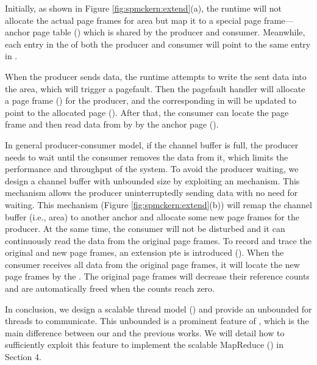 Initially, as shown in Figure \ref{fig:spmckern:extend}(a), the runtime will not allocate the actual page frames for  area but map it to a special page frame--- anchor page table () which is shared by the producer and consumer.
Meanwhile, each entry in the  of both the producer and consumer will point to the same entry in . 

When the producer sends data, the runtime attempts to write the sent data into the  area, which will trigger a pagefault. 
Then the pagefault handler will allocate a page frame () for the producer, and the corresponding  in  will be updated to point to the allocated page (). 
After that, the consumer can locate the page frame   and then read data from  by by the anchor page ().


In general producer-consumer model, if the channel buffer is full, the producer needs to wait until the consumer removes the data from it, which limits the performance and throughput of the system.
To avoid the producer waiting, we design a channel buffer with unbounded size  by exploiting an  mechanism\cite{zhang13lazy}.
This mechanism allows the producer uninterruptedly sending data with no need for waiting.
This  mechanism (Figure  \ref{fig:spmckern:extend}(b)) will remap the channel buffer (i.e.,  area) to another anchor and allocate some new page frames for the producer. 
At the same time, the consumer will not be disturbed and it can continuously read the data from the original page frames.
To record and trace the original  and  new page frames, an extension pte is introduced ().
When the consumer receives all data from the original page frames, it will locate the new page frames by the .
The original page frames will decrease their reference counts and are automatically freed  when the counts reach zero.



In conclusion, we design a scalable thread model (\myth) and provide an unbounded \chan for threads to communicate. This unbounded \chan is a prominent feature of \myth, which is the main difference between our \myth and the previous works. 
We will detail how to sufficiently exploit this feature to implement the scalable MapReduce (\myds)  in Section 4.








